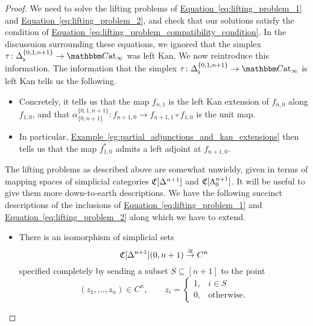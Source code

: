 \documentclass[main.tex]{subfiles}
\begin{document}
\begin{proof}
  We need to solve the lifting problems of \hyperref[eq:lifting_problem_1]{Equation~\ref*{eq:lifting_problem_1}} and \hyperref[eq:lifting_problem_2]{Equation~\ref*{eq:lifting_problem_2}}, and check that our solutions satisfy the condition of \hyperref[eq:lifting_problem_compatibility_condition]{Equation~\ref*{eq:lifting_problem_compatibility_condition}}. In the discussuion surrounding these equations, we ignored that the simplex $\tau\colon \Delta^{\{0,1,n+1\}}_{\flat} \to \ICCat$ was left Kan. We now reintroduce this information. The information that the simplex $\tau\colon \Delta^{\{0,1,n+1\}}_{\flat} \to \ICCat$ is left Kan tells us the following.
  \begin{itemize}
    \item  Concretely, it tells us that the map $f_{n,1}$ is the left Kan extension of $f_{n, 0}$ along $f_{1, 0}$, and that $\alpha_{\{0,n+1\}}^{\{0,1,n+1\}}\colon f_{n+1,0} \to f_{n+1, 1} \circ f_{1, 0} $ is the unit map.

    \item In particular, \hyperref[eg:partial_adjunctions_and_kan_extensions]{Example~\ref*{eg:partial_adjunctions_and_kan_extensions}} then tells us that the map $f_{1,0}^{*}$ admits a left adjoint at $f_{n+1,0}$.
  \end{itemize}

  The lifting problems as described above are somewhat unwieldy, given in terms of mapping spaces of simplicial categories $\mathfrak{C}[\Delta^{n+1}]$ and $\mathfrak{C}[\Lambda^{n+1}_{0}]$. It will be useful to give them more down-to-earth descriptions. We have the following succinct descriptions of the inclusions of \hyperref[eq:lifting_problem_1]{Equation~\ref*{eq:lifting_problem_1}} and \hyperref[eq:lifting_problem_2]{Equation~\ref*{eq:lifting_problem_2}} along which we have to extend.
  \begin{itemize}
    \item There is an isomorphism of simplicial sets
      \begin{equation*}
        \mathfrak{C}[\Delta^{n+1}](0, n+1) \overset{\cong}{\to} C^{n}
      \end{equation*}
      specified completely by sending a subset $S \subseteq [n+1]$ to the point
      \begin{equation*}
        (z_{1}, \ldots, z_{n}) \in C^{n},\qquad z_{i} =
        \begin{cases}
          1, & i \in S \\
          0, &\text{otherwise.}
        \end{cases}
      \end{equation*}


\end{itemize}
\end{proof}
\end{document}
